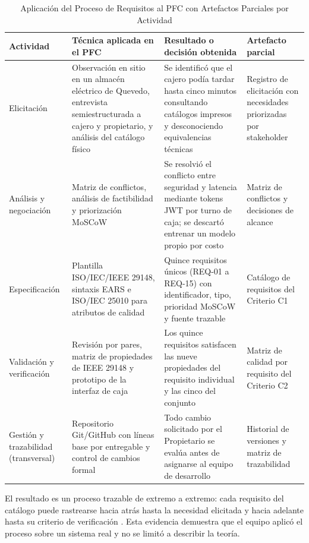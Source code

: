 \begin{table}[htbp]
\centering
\scriptsize
\caption{Aplicación del Proceso de Requisitos al PFC con Artefactos Parciales por Actividad \cite{pohl2025, ieee29148, swebok2024}}
\label{tab:aplicacion_proceso}
\begin{tabularx}{\textwidth}{l Y Y Y}
\toprule
\textbf{Actividad} & \textbf{Técnica aplicada en el PFC} & \textbf{Resultado o decisión obtenida} & \textbf{Artefacto parcial} \\
\midrule
Elicitación & Observación en sitio en un almacén eléctrico de Quevedo, entrevista semiestructurada a cajero y propietario, y análisis del catálogo físico & Se identificó que el cajero podía tardar hasta cinco minutos consultando catálogos impresos y desconociendo equivalencias técnicas & Registro de elicitación con necesidades priorizadas por stakeholder \\
Análisis y negociación & Matriz de conflictos, análisis de factibilidad y priorización MoSCoW & Se resolvió el conflicto entre seguridad y latencia mediante tokens JWT por turno de caja; se descartó entrenar un modelo propio por costo & Matriz de conflictos y decisiones de alcance \\
Especificación & Plantilla ISO/IEC/IEEE 29148, sintaxis EARS e ISO/IEC 25010 para atributos de calidad & Quince requisitos únicos (REQ-01 a REQ-15) con identificador, tipo, prioridad MoSCoW y fuente trazable & Catálogo de requisitos del Criterio C1 \\
Validación y verificación & Revisión por pares, matriz de propiedades de IEEE 29148 y prototipo de la interfaz de caja & Los quince requisitos satisfacen las nueve propiedades del requisito individual y las cinco del conjunto & Matriz de calidad por requisito del Criterio C2 \\
Gestión y trazabilidad (transversal) & Repositorio Git/GitHub con líneas base por entregable y control de cambios formal & Todo cambio solicitado por el Propietario se evalúa antes de asignarse al equipo de desarrollo & Historial de versiones y matriz de trazabilidad \\
\bottomrule
\end{tabularx}
\end{table}

El resultado es un proceso trazable de extremo a extremo: cada requisito del catálogo puede rastrearse hacia atrás hasta la necesidad elicitada y hacia adelante hasta su criterio de verificación \cite{ieee29148, swebok2024}. Esta evidencia demuestra que el equipo aplicó el proceso sobre un sistema real y no se limitó a describir la teoría.
